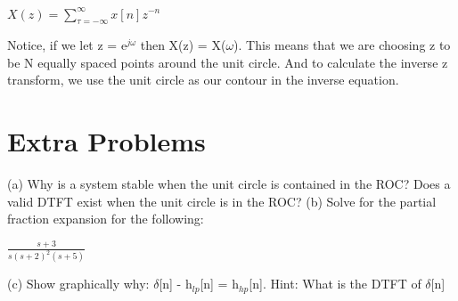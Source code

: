 \documentclass[11pt]{article}
\begin{document}
\begin{center}

$
X(z) = \sum_{\tau  = -\infty}^{\infty} x[n] z^{-n}
$
\end{center}

\vspace{2mm}

Notice, if we let z = e$^{j \omega}$ then X(z) = X($\omega$). This means that we are choosing z to be N equally spaced points around the unit circle. And to calculate the inverse z transform, we use the unit circle as our contour in the inverse equation.



\newpage
\section{Extra Problems}

(a) Why is a system stable when the unit circle is contained in the ROC? Does a valid DTFT exist when the unit circle is in the ROC?\newline
(b) Solve for the partial fraction expansion for the following:\newline
\begin{center}

$
\frac{s+3}{s(s+2)^2(s+5)}
$

\end{center}

\vspace{2mm}

(c) Show graphically why: $\delta$[n] - h$_{lp}$[n] = h$_{hp}$[n]. Hint: What is the DTFT of $\delta$[n]
\end{document}
